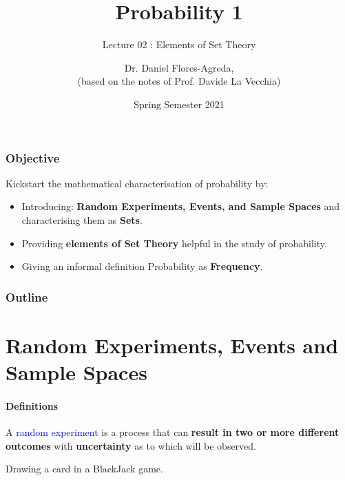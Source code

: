 \documentclass[notes=show]{beamer}\usepackage[]{graphicx}\usepackage[]{color}
\begin{document}
\title[S110015]{Probability 1}
\subtitle{Lecture 02 : Elements of Set Theory}
\author[Flores-Agreda, La Vecchia]{Dr. Daniel Flores-Agreda, \\[0.5em] \tiny{(based on the notes of Prof. Davide La Vecchia)}}
\date{Spring Semester 2021}

\begin{frame}
  \titlepage
\end{frame}


\begin{frame}
\frametitle{Objective}
  Kickstart the mathematical characterisation of probability by:\\[1.5em]
  \begin{itemize}
  \item Introducing: \textbf{Random Experiments, Events, and Sample Spaces} and characterising them as \textbf{Sets}.\\[1em]
  \item Providing \textbf{elements of Set Theory} helpful in the study of probability.\\[1em]
  \item Giving an informal definition Probability as \textbf{Frequency}.
  \end{itemize}
\end{frame}

\begin{frame}
\frametitle{Outline}
\tableofcontents
\end{frame}




\section{Random Experiments, Events and Sample Spaces}

\begin{frame}{\secname}
\framesubtitle{Definitions}
  \begin{definition}
  A \textcolor{blue}{random experiment} is a process that can \textbf{result in two or more different outcomes} with \textbf{uncertainty} as to which will be observed.
  \end{definition}
  \pause
  \begin{example}
    \begin{center}
    Drawing a card in a BlackJack game.
    \end{center}
  \end{example}
\end{frame}
\end{document}
